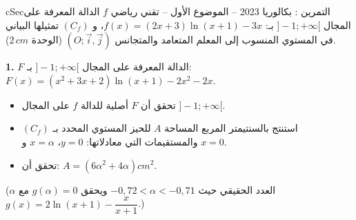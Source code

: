 \documentclass[12pt,a4paper]{article}
\newenvironment{BOX}[2]{\begin{otherlanguage}{english}\begin{arbox}{#1}{#2}}{\end{arbox}\end{otherlanguage}}
\newcounter{exo}
\newenvironment{tamrin}[1]{\stepcounter{exo}\begin{BOX}{cSec}{التمرين \theexo: #1}}{\end{BOX}}
\newenvironment{sq}{\begin{itemize}[leftmargin=2.4em,itemsep=3pt]}{\end{itemize}}
\newcommand{\qa}{\item[(أ)]}\newcommand{\qb}{\item[(ب)]}\newcommand{\qc}{\item[(جـ)]}\newcommand{\qd}{\item[(د)]}\newcommand{\qe}{\item[(هـ)]}
\newcommand{\QQ}[1]{\par\smallskip\textbf{#1.} }
\begin{document}
\begin{tamrin}{بكالوريا 2023 -- الموضوع الأول -- تقني رياضي}
$f$ الدالة المعرفة على المجال $]-1;+\infty[$ بـ: $f(x)=(2x+3)\ln(x+1)-3x$، و $(C_f)$ تمثيلها البياني في المستوي المنسوب إلى المعلم المتعامد والمتجانس $(O;\vec{i},\vec{j})$ (الوحدة $2\,cm$).

\QQ{1} $F$ الدالة المعرفة على المجال $]-1;+\infty[$ بـ: $F(x)=\left(x^{2}+3x+2\right)\ln(x+1)-2x^{2}-2x$.
\begin{sq}
\qa تحقق أن $F$ أصلية للدالة $f$ على المجال $]-1;+\infty[$.
\qb استنتج بالسنتيمتر المربع المساحة $A$ للحيز المستوي المحدد بـ $(C_f)$ والمستقيمات التي معادلاتها: $y=0$، $x=\alpha$ و $x=0$.
\qc تحقق أن: $A=\left(6\alpha^{2}+4\alpha\right)cm^{2}$.
\end{sq}
($\alpha$ العدد الحقيقي حيث $-0{,}72<\alpha<-0{,}71$ ويحقق $g(\alpha)=0$ مع $g(x)=2\ln(x+1)-\dfrac{x}{x+1}$.)
\end{tamrin}
\end{document}
